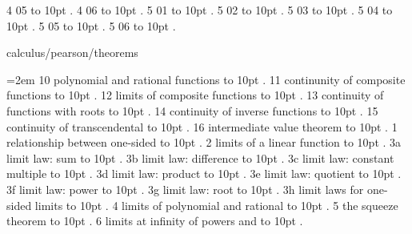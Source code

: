  4 05 \leaders\hbox to 10pt {\hss.\hss}  \hfill {}
 4 06 \leaders\hbox to 10pt {\hss.\hss}  \hfill {}
 5 01 \leaders\hbox to 10pt {\hss.\hss}  \hfill {}
 5 02 \leaders\hbox to 10pt {\hss.\hss}  \hfill {}
 5 03 \leaders\hbox to 10pt {\hss.\hss}  \hfill {}
 5 04 \leaders\hbox to 10pt {\hss.\hss}  \hfill {}
 5 05 \leaders\hbox to 10pt {\hss.\hss}  \hfill {}
 5 06 \leaders\hbox to 10pt {\hss.\hss}  \hfill {}
\smallskip
\par\endgroup
\bigskip
{}
calculus/pearson/theorems
\par\begingroup
\leftskip=2em
\smallskip
{} 10 polynomial and rational functions \leaders\hbox to 10pt {\hss.\hss}  \hfill {}
 11 continunity of composite functions \leaders\hbox to 10pt {\hss.\hss}  \hfill {}
 12 limits of composite functions \leaders\hbox to 10pt {\hss.\hss}  \hfill {}
 13 continuity of functions with roots \leaders\hbox to 10pt {\hss.\hss}  \hfill {}
 14 continuity of inverse functions \leaders\hbox to 10pt {\hss.\hss}  \hfill {}
 15 continuity of transcendental \leaders\hbox to 10pt {\hss.\hss}  \hfill {}
 16 intermediate value theorem \leaders\hbox to 10pt {\hss.\hss}  \hfill {}
 1 relationship between one-sided \leaders\hbox to 10pt {\hss.\hss}  \hfill {}
 2 limits of a linear function \leaders\hbox to 10pt {\hss.\hss}  \hfill {}
 3a limit law: sum \leaders\hbox to 10pt {\hss.\hss}  \hfill {}
 3b limit law: difference \leaders\hbox to 10pt {\hss.\hss}  \hfill {}
 3c limit law: constant multiple \leaders\hbox to 10pt {\hss.\hss}  \hfill {}
 3d limit law: product \leaders\hbox to 10pt {\hss.\hss}  \hfill {}
 3e limit law: quotient \leaders\hbox to 10pt {\hss.\hss}  \hfill {}
 3f limit law: power \leaders\hbox to 10pt {\hss.\hss}  \hfill {}
 3g limit law: root \leaders\hbox to 10pt {\hss.\hss}  \hfill {}
 3h limit laws for one-sided limits \leaders\hbox to 10pt {\hss.\hss}  \hfill {}
 4 limits of polynomial and rational \leaders\hbox to 10pt {\hss.\hss}  \hfill {}
 5 the squeeze theorem \leaders\hbox to 10pt {\hss.\hss}  \hfill {}
 6 limits at infinity of powers and \leaders\hbox to 10pt {\hss.\hss}  \hfill {}
